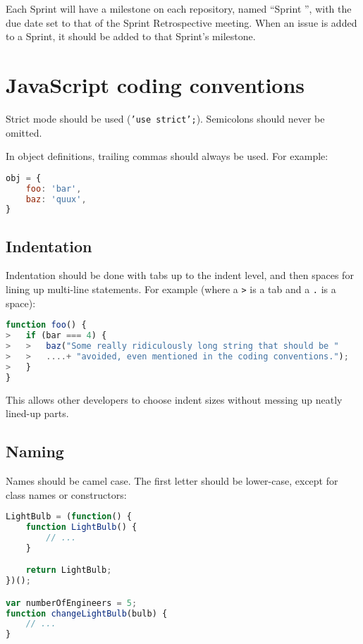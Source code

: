 Each Sprint will have a milestone on each repository, named ``Sprint '',
with the due date set to that of the Sprint Retrospective meeting. When
an issue is added to a Sprint, it should be added to that Sprint's
milestone.

\section{JavaScript coding
conventions}

Strict mode should be used (\texttt{'use strict';}). Semicolons should
never be omitted.

In object definitions, trailing commas should always be used. For
example:

\begin{lstlisting}[language=javascript]
obj = {
    foo: 'bar',
    baz: 'quux',
}
\end{lstlisting}

\subsection{Indentation}

Indentation should be done with tabs up to the indent level, and then
spaces for lining up multi-line statements. For example (where a
\texttt{\textgreater{}} is a tab and a \texttt{.} is a space):

\begin{lstlisting}[language=javascript]
function foo() {
>   if (bar === 4) {
>   >   baz("Some really ridiculously long string that should be "
>   >   ....+ "avoided, even mentioned in the coding conventions.");
>   }
}
\end{lstlisting}

This allows other developers to choose indent sizes without messing up
neatly lined-up parts.

\subsection{Naming}

Names should be camel case. The first letter should be lower-case,
except for class names or constructors:

\begin{lstlisting}[language=javascript]
LightBulb = (function() {
    function LightBulb() {
        // ...
    }

    return LightBulb;
})();

var numberOfEngineers = 5;
function changeLightBulb(bulb) {
    // ...
}
\end{lstlisting}

